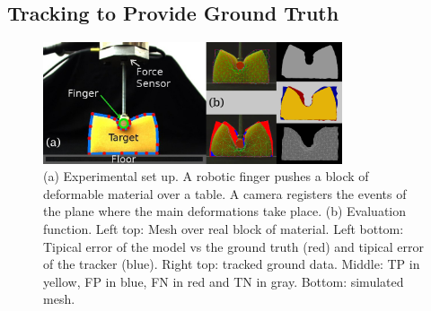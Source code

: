 \documentclass[journal]{IEEEtran}
\begin{document}
\subsection{Tracking to Provide Ground Truth}

\begin{figure}[!t]
\centering
\includegraphics[width=88mm]{arrio2}
\caption{(a) Experimental set up.  A robotic finger pushes a block of deformable material over a table.  A camera registers the events of the plane where the main deformations take place.  (b) Evaluation function.  Left top: Mesh over real block of material.  Left bottom: Tipical error of the model vs the ground truth (red) and tipical error of the tracker (blue).  Right top: tracked ground data.  Middle: TP in yellow, FP in blue, FN in red and TN in gray.  Bottom: simulated mesh. }
\label{fig:scene}
\end{figure}
\end{document}
